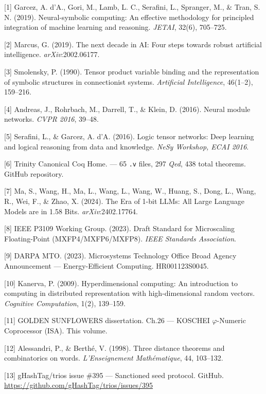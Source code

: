 [1] Garcez, A. d'A., Gori, M., Lamb, L. C.,
Serafini, L., Spranger, M., \& Tran, S. N. (2019).
Neural-symbolic computing: An effective
methodology for principled integration of machine
learning and reasoning. \emph{JETAI}, 32(6),
705--725.

[2] Marcus, G. (2019). The next decade in AI:
Four steps towards robust artificial intelligence.
\emph{arXiv}:2002.06177.

[3] Smolensky, P. (1990). Tensor product
variable binding and the representation of
symbolic structures in connectionist systems.
\emph{Artificial Intelligence}, 46(1--2),
159--216.

[4] Andreas, J., Rohrbach, M., Darrell, T., \&
Klein, D. (2016). Neural module networks.
\emph{CVPR 2016}, 39--48.

[5] Serafini, L., \& Garcez, A. d'A. (2016).
Logic tensor networks: Deep learning and logical
reasoning from data and knowledge. \emph{NeSy
Workshop, ECAI 2016}.

[6] Trinity Canonical Coq Home.
 --- 65
\texttt{.v} files, 297 \emph{Qed}, 438 total
theorems. GitHub repository.

[7] Ma, S., Wang, H., Ma, L., Wang, L., Wang,
W., Huang, S., Dong, L., Wang, R., Wei, F., \&
Zhao, X. (2024). The Era of 1-bit LLMs: All Large
Language Models are in 1.58 Bits.
\emph{arXiv}:2402.17764.

[8] IEEE P3109 Working Group. (2023). Draft
Standard for Microscaling Floating-Point
(MXFP4/MXFP6/MXFP8). \emph{IEEE Standards
Association}.

[9] DARPA MTO. (2023). Microsystems Technology
Office Broad Agency Announcement ---
Energy-Efficient Computing. HR001123S0045.

[10] Kanerva, P. (2009). Hyperdimensional
computing: An introduction to computing in
distributed representation with high-dimensional
random vectors. \emph{Cognitive Computation},
1(2), 139--159.

[11] GOLDEN SUNFLOWERS dissertation. Ch.26 ---
KOSCHEI $\varphi$-Numeric Coprocessor (ISA). This volume.

[12] Alessandri, P., \& Berthé, V. (1998).
Three distance theorems and combinatorics on
words. \emph{L'Enseignement Mathématique}, 44,
103--132.

[13] gHashTag/trios issue \#395 --- Sanctioned
seed protocol. GitHub.
\url{https://github.com/gHashTag/trios/issues/395}


